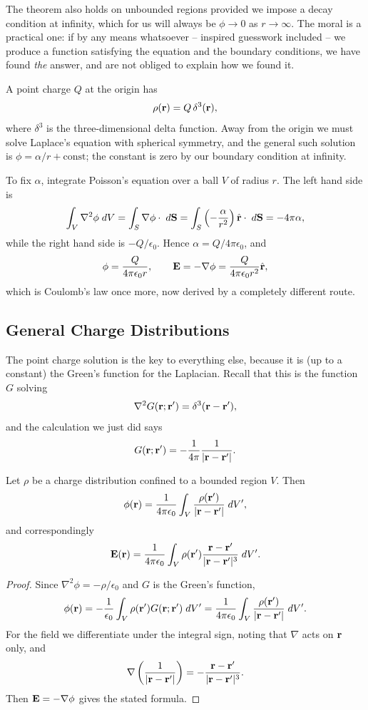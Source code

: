 \documentclass[a4paper]{scrartcl}
\newcommand{\hh}[1]{\hat{\vv{#1}}}
\begin{document}
The theorem also holds on unbounded regions provided we impose a decay condition at infinity, which for us will always be $\phi \to 0$ as $r \to \infty$. The moral is a practical one: if by any means whatsoever -- inspired guesswork included -- we produce a function satisfying the equation and the boundary conditions, we have found \emph{the} answer, and are not obliged to explain how we found it.

\begin{example}
	A point charge $Q$ at the origin has
	$$
	\rho(\mathbf{r}) = Q\, \delta^3(\mathbf{r}),
	$$
	where $\delta^3$ is the three-dimensional delta function. Away from the origin we must solve Laplace's equation with spherical symmetry, and the general such solution is $\phi = \alpha/r + \text{const}$; the constant is zero by our boundary condition at infinity.

	To fix $\alpha$, integrate Poisson's equation over a ball $V$ of radius $r$. The left hand side is
	$$
	\int_V \nabla^2 \phi \dd V = \int_S \nabla \phi \cdot \dd \vv{S} = \int_S \left(-\frac{\alpha}{r^2}\right)\hh{r}\cdot \dd \vv{S} = -4\pi \alpha,
	$$
	while the right hand side is $-Q/\epsilon_0$. Hence $\alpha = Q/4\pi\epsilon_0$, and
	$$
	\phi = \frac{Q}{4\pi\epsilon_0 r}, \qquad \vv{E} = -\nabla \phi = \frac{Q}{4\pi \epsilon_0 r^2}\hh{r},
	$$
	which is Coulomb's law once more, now derived by a completely different route.
\end{example}

\subsection{General Charge Distributions}

The point charge solution is the key to everything else, because it is (up to a constant) the Green's function for the Laplacian. Recall that this is the function $G$ solving
$$
\nabla^2 G(\mathbf{r}; \mathbf{r}') = \delta^3(\mathbf{r}-\mathbf{r}'),
$$
and the calculation we just did says
$$
G(\mathbf{r}; \mathbf{r}') = -\frac{1}{4\pi}\frac{1}{|\mathbf{r}-\mathbf{r}'|}.
$$

\begin{proposition}
	\label{prop:general-phi}
	Let $\rho$ be a charge distribution confined to a bounded region $V$. Then
	$$
	\phi(\mathbf{r}) = \frac{1}{4\pi\epsilon_0}\int_V \frac{\rho(\mathbf{r}')}{|\mathbf{r}-\mathbf{r}'|}\; d V',
	$$
	and correspondingly
	$$
	\mathbf{E}(\mathbf{r}) = \frac{1}{4\pi \epsilon_0}\int_V \rho(\mathbf{r}')\frac{\mathbf{r}-\mathbf{r}'}{|\mathbf{r}-\mathbf{r}'|^3}\; d V'.
	$$
\end{proposition}
\begin{proof}
	Since $\nabla^2 \phi = -\rho/\epsilon_0$ and $G$ is the Green's function,
	$$
	\phi(\mathbf{r}) = -\frac{1}{\epsilon_0}\int_V \rho(\mathbf{r}') G(\mathbf{r};\mathbf{r}')\; d V' = \frac{1}{4\pi \epsilon_0}\int_V \frac{\rho(\mathbf{r}')}{|\mathbf{r}-\mathbf{r}'|}\; d V'.
	$$
	For the field we differentiate under the integral sign, noting that $\nabla$ acts on $\mathbf{r}$ only, and
	$$
	\nabla\left(\frac{1}{|\mathbf{r}-\mathbf{r}'|}\right) = -\frac{\mathbf{r}-\mathbf{r}'}{|\mathbf{r}-\mathbf{r}'|^3}.
	$$
	Then $\mathbf{E} = -\nabla \phi$ gives the stated formula.
\end{proof}
\end{document}

